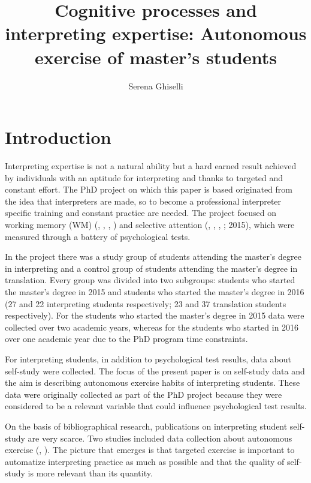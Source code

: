 \documentclass[output=paper]{../langscibook}
\author{Serena Ghiselli\affiliation{University of Bologna}}
\title{Cognitive processes and interpreting expertise: Autonomous exercise of master’s students}
\begin{document}
\maketitle
{}


\section{Introduction}


Interpreting expertise is not a natural ability but a hard earned result achieved by individuals with an aptitude for interpreting and thanks to targeted and constant effort. The PhD project on which this paper is based originated from the idea that interpreters are made, so to become a professional interpreter specific training and constant practice are needed. The project focused on working memory (WM) (\citealt{BaddeleyHitch1974}, \citealt{Baddeley2000}, \citealt{Gerver1975,Gerver1976}, \citealt{PadillaBenitez1995}) and selective attention (\citealt{Cowan2000}, \citealt{Moser-Mercer2000}, \citealt{Seeber2011}, \citealt{TimarovaEtAl2014}; 2015), which were measured through a battery of psychological tests.

In the project there was a study group of students attending the master’s degree in interpreting and a control group of students attending the master’s degree in translation. Every group was divided into two subgroups: students who started the master’s degree in 2015 and students who started the master’s degree in 2016 (27 and 22 interpreting students respectively; 23 and 37 translation students respectively). For the students who started the master’s degree in 2015 data were collected over two academic years, whereas for the students who started in 2016 over one academic year due to the PhD program time constraints.

For interpreting students, in addition to psychological test results, data about self-study were collected. The focus of the present paper is on self-study data and the aim is describing autonomous exercise habits of interpreting students. These data were originally collected as part of the PhD project because they were considered to be a relevant variable that could influence psychological test results.

On the basis of bibliographical research, publications on interpreting student self-study are very scarce. Two studies included data collection about autonomous exercise (\citealt{Fan2012}, \citealt{Wang2016}). The picture that emerges is that targeted exercise is important to automatize interpreting practice as much as possible and that the quality of self-study is more relevant than its quantity.
\end{document}
